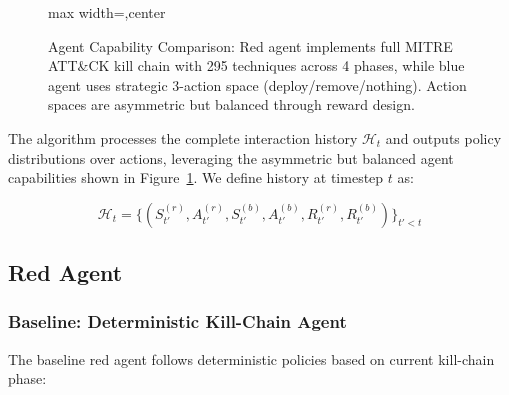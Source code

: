 \documentclass[12pt,oneside]{article}
\begin{document}
\begin{figure}[H]
\begin{adjustbox}{max width=\linewidth,center}
\end{adjustbox}
\caption{Agent Capability Comparison: Red agent implements full MITRE ATT\&CK kill chain with 295 techniques across 4 phases, while blue agent uses strategic 3-action space (deploy/remove/nothing). Action spaces are asymmetric but balanced through reward design.}
\label{fig:agent_capabilities}
\end{figure}

The algorithm processes the complete interaction history $\mathcal{H}_t$ and outputs policy distributions over actions, leveraging the asymmetric but balanced agent capabilities shown in Figure~\ref{fig:agent_capabilities}. We define history at timestep $t$ as:

\begin{equation}
\mathcal{H}_t = \{(S_{t'}^{(r)}, A_{t'}^{(r)}, S_{t'}^{(b)}, A_{t'}^{(b)}, R_{t'}^{(r)}, R_{t'}^{(b)})\}_{t' < t}
\end{equation}

\subsection{Red Agent}

\subsubsection{Baseline: Deterministic Kill-Chain Agent}
The baseline red agent follows deterministic policies based on current kill-chain phase:
\end{document}
